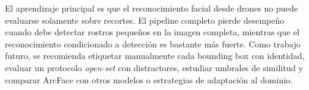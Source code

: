\documentclass[11pt]{article}
\begin{document}
El aprendizaje principal es que el reconocimiento facial desde drones no puede evaluarse solamente sobre recortes. El pipeline completo pierde desempe\~no cuando debe detectar rostros peque\~nos en la imagen completa, mientras que el reconocimiento condicionado a detecci\'on es bastante m\'as fuerte. Como trabajo futuro, se recomienda etiquetar manualmente cada bounding box con identidad, evaluar un protocolo \textit{open-set} con distractores, estudiar umbrales de similitud y comparar ArcFace con otros modelos o estrategias de adaptaci\'on al dominio.

\newpage
{}
{}


\end{document}
